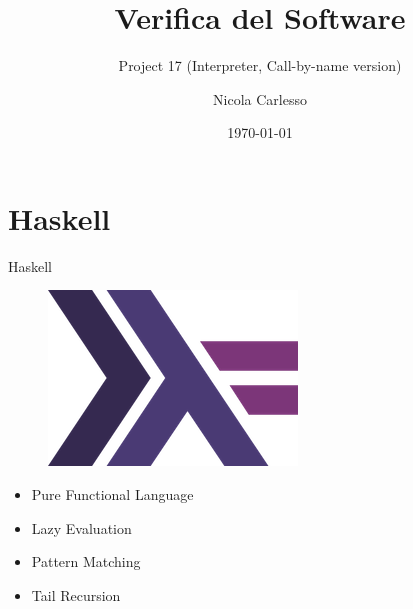 \documentclass{beamer}
\title{Verifica del Software}
\subtitle{Project 17 (Interpreter, Call-by-name version)}
\author{Nicola Carlesso}
\institute{UniPd - Informatica}
\date{\today}
\begin{document}
	\begin{frame}
		\titlepage
	\end{frame}

\section{Haskell}
\begin{frame}{Haskell}
	\begin{figure}
		\includegraphics[scale=0.3]{img/haskell-logo}
	\end{figure}
	\begin{itemize}
		\item Pure Functional Language
		\item Lazy Evaluation
		\item Pattern Matching
		\item Tail Recursion
	\end{itemize}
\end{frame}
\end{document}
